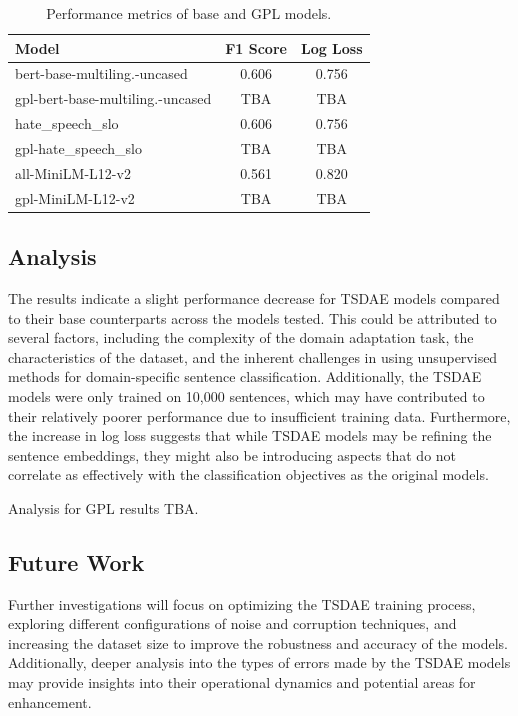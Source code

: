 \documentclass[fleqn,moreauthors,10pt]{ds_report}
\begin{document}
\begin{table}[h]
\centering
\begin{tabular}{|l|c|c|}
\hline
\textbf{Model} & \textbf{F1 Score} & \textbf{Log Loss} \\
\hline
bert-base-multiling.-uncased & 0.606 & 0.756 \\
gpl-bert-base-multiling.-uncased & TBA & TBA \\
hate\_speech\_slo & 0.606 & 0.756 \\
gpl-hate\_speech\_slo & TBA & TBA \\
all-MiniLM-L12-v2 & 0.561 & 0.820 \\
gpl-MiniLM-L12-v2 & TBA & TBA \\
\hline
\end{tabular}
\caption{Performance metrics of base and GPL models.}
\label{table:tsdae_performance}
\end{table}

\subsection*{Analysis}

The results indicate a slight performance decrease for TSDAE models compared to their base counterparts across the models tested. This could be attributed to several factors, including the complexity of the domain adaptation task, the characteristics of the dataset, and the inherent challenges in using unsupervised methods for domain-specific sentence classification. Additionally, the TSDAE models were only trained on 10,000 sentences, which may have contributed to their relatively poorer performance due to insufficient training data. Furthermore, the increase in log loss suggests that while TSDAE models may be refining the sentence embeddings, they might also be introducing aspects that do not correlate as effectively with the classification objectives as the original models.

Analysis for GPL results TBA.

\subsection*{Future Work}

Further investigations will focus on optimizing the TSDAE training process, exploring different configurations of noise and corruption techniques, and increasing the dataset size to improve the robustness and accuracy of the models. Additionally, deeper analysis into the types of errors made by the TSDAE models may provide insights into their operational dynamics and potential areas for enhancement.
\end{document}
